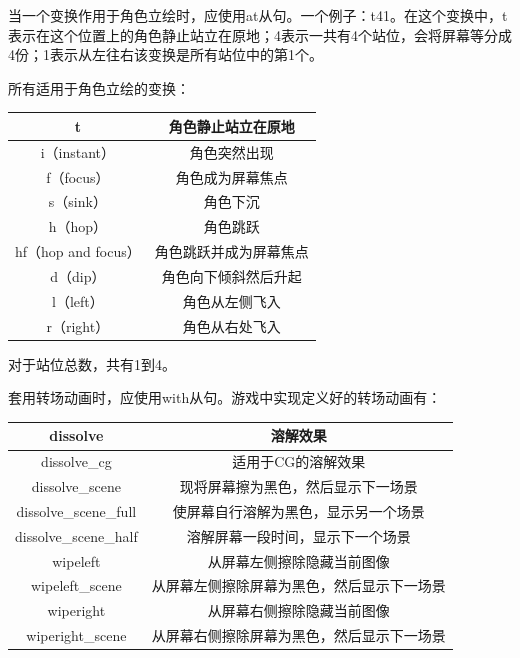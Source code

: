 \documentclass[../../Main.tex]{subfiles}
\begin{document}
当一个变换作用于角色立绘时，应使用at从句。一个例子：t41。在这个变换中，t表示在这个位置上的角色静止站立在原地；4表示一共有4个站位，会将屏幕等分成4份；1表示从左往右该变换是所有站位中的第1个。

所有适用于角色立绘的变换：

\begin{center}
    \tabletail{\hline}
    \tablelasttail{\hline}
    \begin{supertabular}{|c|c|}
        \hline
        t & 角色静止站立在原地 \\
        \hline
        i（instant） & 角色突然出现 \\
        \hline
        f（focus） & 角色成为屏幕焦点 \\
        \hline
        s（sink） & 角色下沉 \\
        \hline
        h（hop） & 角色跳跃 \\
        \hline
        hf（hop and focus） & 角色跳跃并成为屏幕焦点 \\
        \hline
        d（dip） & 角色向下倾斜然后升起 \\
        \hline
        l（left） & 角色从左侧飞入 \\
        \hline
        r（right） & 角色从右处飞入 \\
        \hline
    \end{supertabular}
\end{center}

对于站位总数，共有1到4。

套用转场动画时，应使用with从句。游戏中实现定义好的转场动画有：

\begin{center}
    \tabletail{\hline}
    \tablelasttail{\hline}
    \begin{supertabular}{|c|c|}
        \hline
        dissolve & 溶解效果 \\
        \hline
        dissolve\_cg & 适用于CG的溶解效果 \\
        \hline
        dissolve\_scene & 现将屏幕擦为黑色，然后显示下一场景 \\
        \hline
        dissolve\_scene\_full & 使屏幕自行溶解为黑色，显示另一个场景 \\
        \hline
        dissolve\_scene\_half & 溶解屏幕一段时间，显示下一个场景 \\
        \hline
        wipeleft & 从屏幕左侧擦除隐藏当前图像 \\
        \hline
        wipeleft\_scene & 从屏幕左侧擦除屏幕为黑色，然后显示下一场景 \\
        \hline
        wiperight & 从屏幕右侧擦除隐藏当前图像 \\
        \hline
        wiperight\_scene & 从屏幕右侧擦除屏幕为黑色，然后显示下一场景 \\
        \hline
    \end{supertabular}
\end{center}
\end{document}
